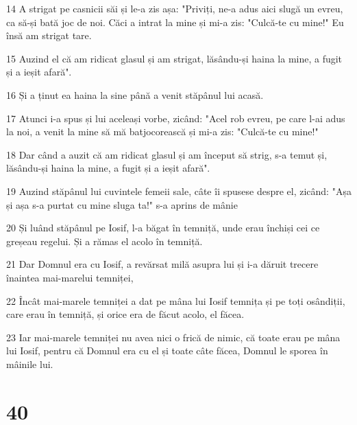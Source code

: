 \par 14 A strigat pe casnicii săi și le-a zis așa: "Priviți, ne-a adus aici slugă un evreu, ca să-și bată joc de noi. Căci a intrat la mine și mi-a zis: "Culcă-te cu mine!" Eu însă am strigat tare.
\par 15 Auzind el că am ridicat glasul și am strigat, lăsându-și haina la mine, a fugit și a ieșit afară".
\par 16 Și a ținut ea haina la sine până a venit stăpânul lui acasă.
\par 17 Atunci i-a spus și lui aceleași vorbe, zicând: "Acel rob evreu, pe care l-ai adus la noi, a venit la mine să mă batjocorească și mi-a zis: "Culcă-te cu mine!"
\par 18 Dar când a auzit că am ridicat glasul și am început să strig, s-a temut și, lăsându-și haina la mine, a fugit și a ieșit afară".
\par 19 Auzind stăpânul lui cuvintele femeii sale, câte îi spusese despre el, zicând: "Așa și așa s-a purtat cu mine sluga ta!" s-a aprins de mânie
\par 20 Și luând stăpânul pe Iosif, l-a băgat în temniță, unde erau închiși cei ce greșeau regelui. Și a rămas el acolo în temniță.
\par 21 Dar Domnul era cu Iosif, a revărsat milă asupra lui și i-a dăruit trecere înaintea mai-marelui temniței,
\par 22 Încât mai-marele temniței a dat pe mâna lui Iosif temnița și pe toți osândiții, care erau în temniță, și orice era de făcut acolo, el făcea.
\par 23 Iar mai-marele temniței nu avea nici o frică de nimic, că toate erau pe mâna lui Iosif, pentru că Domnul era cu el și toate câte făcea, Domnul le sporea în mâinile lui.

\chapter{40}

